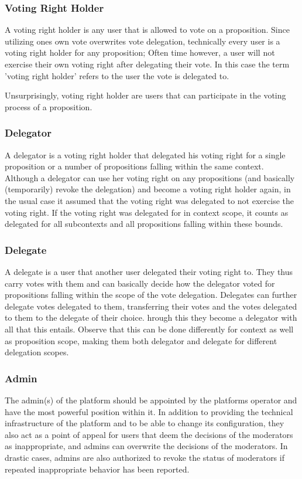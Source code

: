 \subsubsection{Voting Right Holder}
\label{ssec:Roles_VotingRightHolder}
A voting right holder is any user that is allowed to vote on a proposition.
Since utilizing ones own vote overwrites vote delegation, technically every user is a voting right holder for any proposition; Often time however, a user will not exercise their own voting right after delegating their vote.
In this case the term 'voting right holder' refers to the user the vote is delegated to. 

Unsurprisingly, voting right holder are users that can participate in the voting process of a proposition.

\subsubsection{Delegator}
\label{ssec:Roles_Delegator}
A delegator is a voting right holder that delegated his voting right for a single proposition or a number of propositions falling within the same context.
Although a delegator can use her voting right on any propositions (and basically (temporarily) revoke the delegation) and become a voting right holder again, in the usual case it assumed that the voting right was delegated to not exercise the voting right.
If the voting right was delegated for in context scope, it counts as delegated for all subcontexts and all propositions falling within these bounds. 

\subsubsection{Delegate}
\label{ssec:Roles_Delegate}
A delegate is a user that another user delegated their voting right to.
They thus carry votes with them and can basically decide how the delegator voted for propositions falling within the scope of the vote delegation.
Delegates can further delegate votes delegated to them, transferring their votes and the votes delegated to them to the delegate of their choice. 
hrough this they become a delegator with all that this entails.
Observe that this can be done differently for context as well as proposition scope, making them both delegator and delegate for different delegation scopes.

\subsubsection{Admin}
\label{ssec:Roles_Admin}
The admin(s) of the platform should be appointed by the platforms operator and have the most powerful position within it.
In addition to providing the technical infrastructure of the platform and to be able to change its configuration, they also act as a point of appeal for users that deem the decisions of the moderators as inappropriate, and admins can overwrite the decisions of the moderators.
In drastic cases, admins are also authorized to revoke the status of moderators if repeated inappropriate behavior has been reported. 

